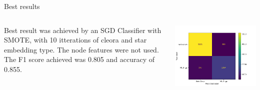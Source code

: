\begin{frame}{Best results}
\begin{columns}

    \begin{column}{0.5\textwidth}
    Best result was achieved by an SGD Classifier with SMOTE, with 10 itterations of cleora and star embedding type. The node features were not used. The F1 score achieved was 0.805 and accuracy of 0.855.
    \end{column}
    
    \begin{column}{0.5\textwidth}
    \includegraphics[width=1\textwidth]{images/cm_SGDClassifier.png}
    \end{column}
\end{columns}
\end{frame}